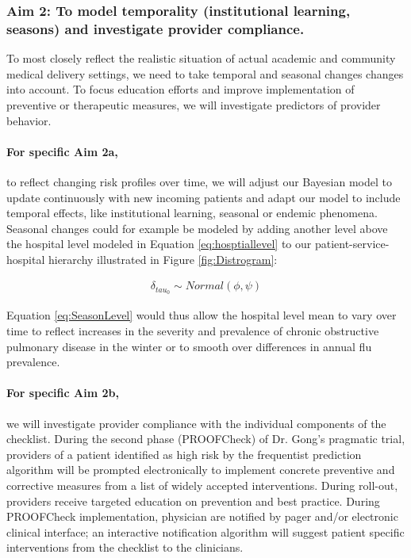 \documentclass[11pt,notitlepage]{article}
\begin{document}
\subsubsection*{Aim 2: To model temporality (institutional learning, seasons) and investigate provider compliance.}
To most closely reflect the realistic situation of actual academic and community medical delivery settings, we need to take temporal and seasonal changes changes into account. To focus education efforts and improve implementation of preventive or therapeutic measures, we will investigate predictors of provider behavior. 

\paragraph*{For specific Aim 2a,} to reflect changing risk profiles over time, we will adjust our Bayesian model to update continuously with new incoming patients and adapt our model to include temporal effects, like institutional learning, seasonal or endemic phenomena. Seasonal changes could for example be modeled by adding another level above the hospital level modeled in Equation \ref{eq:hosptiallevel} to our patient-service-hospital hierarchy illustrated in Figure \ref{fig:Distrogram}:

\begin{figure}
   \vspace{-20pt}
\begin{align}\label{eq:SeasonLevel}
\delta_{tau_{0}} \sim Normal(\phi, \psi) 
\end{align}
   \vspace{-30pt}
\end{figure}

Equation \ref{eq:SeasonLevel} would thus allow the hospital level mean to vary over time to reflect increases in the severity and prevalence of chronic obstructive pulmonary disease in the winter or to smooth over differences in annual flu prevalence. 
  
\paragraph*{For specific Aim 2b,} we will investigate provider compliance with the individual components of the checklist. During the second phase (PROOFCheck) of Dr. Gong's pragmatic trial, providers of a patient identified as high risk by the frequentist prediction algorithm will be prompted electronically to implement concrete preventive and corrective measures from a list of widely accepted interventions. During roll-out, providers receive targeted education on prevention and best practice. During PROOFCheck implementation, physician are notified by pager and/or electronic clinical interface; an interactive notification algorithm will suggest patient specific interventions from the checklist to the clinicians. 
\end{document}
